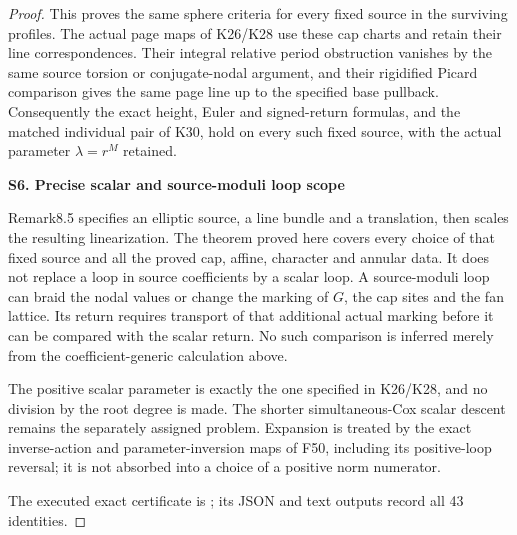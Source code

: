 \begin{proof}
This proves the same sphere criteria for every fixed
source in the surviving profiles. The actual page
maps of K26/K28 use these cap charts and retain their
line correspondences. Their integral relative
period obstruction vanishes by the same source
torsion or conjugate-nodal argument, and their
rigidified Picard comparison gives the same page
line up to the specified base pullback. Consequently
the exact height, Euler and signed-return formulas,
and the matched individual pair of K30, hold on
every such fixed source, with the actual parameter
\(\lambda=r^M\) retained.

\par

\medskip\noindent\textbf{S6. Precise scalar and source-moduli loop scope}

\par\nobreak

Remark8.5 specifies an elliptic source, a line bundle
and a translation, then scales the resulting
linearization. The theorem proved here covers every
choice of that fixed source and all the proved cap,
affine, character and annular data. It does not
replace a loop in source coefficients by a scalar
loop. A source-moduli loop can braid the nodal values
or change the marking of \(G\), the cap sites and
the fan lattice. Its return requires transport of
that additional actual marking before it can be
compared with the scalar return. No such comparison
is inferred merely from the coefficient-generic
calculation above.

The positive scalar parameter is exactly the one
specified in K26/K28, and no division by the root
degree is made. The shorter simultaneous-Cox scalar
descent remains the separately assigned problem.
Expansion is treated by the exact inverse-action
and parameter-inversion maps of F50, including its
positive-loop reversal; it is not absorbed into a
choice of a positive norm numerator.

The executed exact certificate is ; its JSON and text outputs record all 43 identities.
\end{proof}
